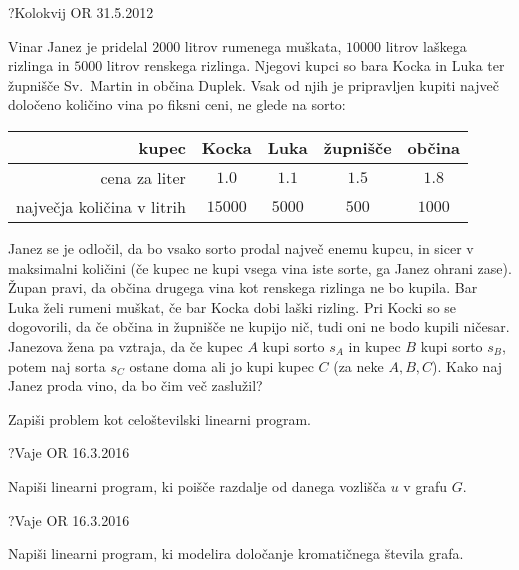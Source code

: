 \begin{naloga}{?}{Kolokvij OR 31.5.2012}
\begin{vprasanje}
Vinar Janez je pridelal $2000$ litrov rumenega muškata,
$10000$ litrov laškega rizlinga in $5000$ litrov renskega rizlinga.
Njegovi kupci so bara Kocka in Luka ter župnišče Sv.~Martin in občina Duplek.
Vsak od njih je pripravljen kupiti največ določeno količino vina
po fiksni ceni, ne glede na sorto:

\begin{center}
\begin{tabular}{r|cccc}
kupec & Kocka & Luka & župnišče & občina \\ \hline
cena za liter & $1.0$ & $1.1$ & $1.5$ & $1.8$ \\
največja količina v litrih & $15000$ & $5000$ & $500$ & $1000$ \\
\end{tabular}
\end{center}

Janez se je odločil, da bo vsako sorto prodal največ enemu kupcu,
in sicer v maksimalni količini
(če kupec ne kupi vsega vina iste sorte, ga Janez ohrani zase).
Župan pravi, da občina drugega vina kot renskega rizlinga ne bo kupila.
Bar Luka želi rumeni muškat, če bar Kocka dobi laški rizling.
Pri Kocki so se dogovorili, da če občina in župnišče ne kupijo nič,
tudi oni ne bodo kupili ničesar.
Janezova žena pa vztraja,
da če kupec $A$ kupi sorto $s_A$ in kupec $B$ kupi sorto $s_B$,
potem naj sorta $s_C$ ostane doma ali jo kupi kupec $C$ (za neke $A, B, C$).
Kako naj Janez proda vino, da bo čim več zaslužil?

Zapiši problem kot celoštevilski linearni program.
\end{vprasanje}
\begin{odgovor}
\end{odgovor}
\end{naloga}

\begin{naloga}{?}{Vaje OR 16.3.2016}
\begin{vprasanje}
Napiši linearni program,
ki poišče razdalje od danega vozlišča $u$ v grafu $G$.
\end{vprasanje}
\begin{odgovor}
\end{odgovor}
\end{naloga}


\begin{naloga}{?}{Vaje OR 16.3.2016}
\begin{vprasanje}
Napiši linearni program,
ki modelira določanje kromatičnega števila grafa.
\end{vprasanje}
\begin{odgovor}
\end{odgovor}
\end{naloga}


